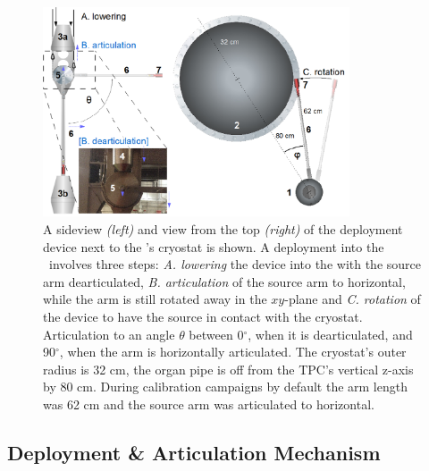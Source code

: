 \begin{figure}[htbp]
 \centering
\includegraphics[width=0.81\textwidth]{Figures/DeploymentDevice_XY_view2}
  \caption{A sideview \textit{(left)} and view from the top \textit{(right)} of the deployment device next to the \tpc's cryostat is shown. A deployment into the \lsv\ involves three steps: \textit{A. lowering} the device into the \lsv with the source arm dearticulated, \textit{B. articulation} of the source arm to horizontal, while the arm is still rotated away in the $xy$-plane and \textit{C. rotation} of the device to have the source in contact with the cryostat. Articulation to an angle $\theta$ between 0$^{\circ}$, when it is dearticulated, and 90$^{\circ}$, when the arm is horizontally articulated. The cryostat's outer radius is 32 cm, the organ pipe is off from the TPC's vertical z-axis by 80 cm. During calibration campaigns by default the arm length was 62 cm and the source arm was articulated to horizontal.
\label{fig:DeploymentDevice}}
\end{figure} 


\subsection{Deployment \& Articulation Mechanism}\label{sec:DeploymentArticulation}


